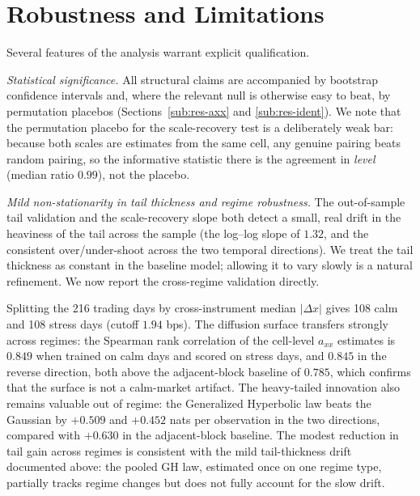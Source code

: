 \documentclass[11pt]{article}
\theoremstyle{plain}
\theoremstyle{definition}
\newcommand{\axx}{a_{xx}}
\begin{document}
\section{Robustness and Limitations}
\label{sec:robustness}

Several features of the analysis warrant explicit qualification.

\emph{Statistical significance.} All structural claims are accompanied by bootstrap
confidence intervals and, where the relevant null is otherwise easy to beat, by
permutation placebos (Sections~\ref{sub:res-axx} and \ref{sub:res-ident}). We note
that the permutation placebo for the scale-recovery test is a deliberately weak bar:
because both scales are estimates from the same cell, any genuine pairing beats random
pairing, so the informative statistic there is the agreement in \emph{level} (median
ratio $0.99$), not the placebo.

\emph{Mild non-stationarity in tail thickness and regime robustness.} The out-of-sample
tail validation and the scale-recovery slope both detect a small, real drift in the
heaviness of the tail across the sample (the log--log slope of $1.32$, and the
consistent over/under-shoot across the two temporal directions). We treat the tail
thickness as constant in the baseline model; allowing it to vary slowly is a natural
refinement. We now report the cross-regime validation directly.

Splitting the 216 trading days by cross-instrument median $|\Delta x|$ gives 108 calm
and 108 stress days (cutoff $1.94$ bps). The diffusion surface transfers strongly across
regimes: the Spearman rank correlation of the cell-level $\axx$ estimates is $0.849$
when trained on calm days and scored on stress days, and $0.845$ in the reverse
direction, both above the adjacent-block baseline of $0.785$, which confirms that the
surface is not a calm-market artifact. The heavy-tailed innovation also remains valuable
out of regime: the Generalized Hyperbolic law beats the Gaussian by $+0.509$ and
$+0.452$ nats per observation in the two directions, compared with $+0.630$ in the
adjacent-block baseline. The modest reduction in tail gain across regimes is consistent
with the mild tail-thickness drift documented above: the pooled GH law, estimated once
on one regime type, partially tracks regime changes but does not fully account for the
slow drift.
\end{document}
